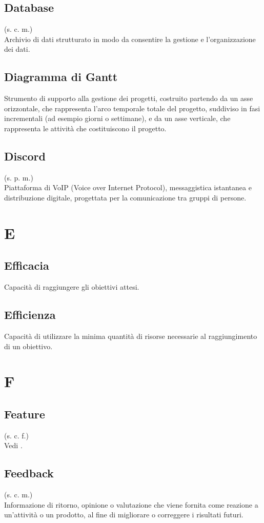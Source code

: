     \subsection{Database}
    (s. c. m.)\\
    Archivio di dati strutturato in modo da consentire la gestione e 
    l'organizzazione dei dati.
    \subsection{Diagramma di Gantt}
    Strumento di supporto alla gestione dei progetti, costruito partendo da 
    un asse orizzontale, che rappresenta l'arco temporale totale del progetto, 
    suddiviso in fasi incrementali (ad esempio giorni o settimane), e da un asse 
    verticale, che rappresenta le attività che costituiscono il progetto.
    \subsection{Discord}
    (s. p. m.)\\
    Piattaforma di VoIP (Voice over Internet Protocol), messaggistica istantanea 
    e distribuzione digitale, progettata per la comunicazione tra gruppi di persone.
\pagebreak
\section{E}
    \subsection{Efficacia}
    Capacità di raggiungere gli obiettivi attesi.
    \subsection{Efficienza}
    Capacità di utilizzare la minima quantità di risorse necessarie al raggiungimento
    di un obiettivo.
\pagebreak
\section{F}
    \subsection{Feature}
    (s. c. f.)\\
    Vedi .
    \subsection{Feedback}
    (s. c. m.)\\
    Informazione di ritorno, opinione o valutazione che viene fornita come reazione a 
    un'attività o un prodotto, al fine di migliorare o correggere i risultati futuri.
